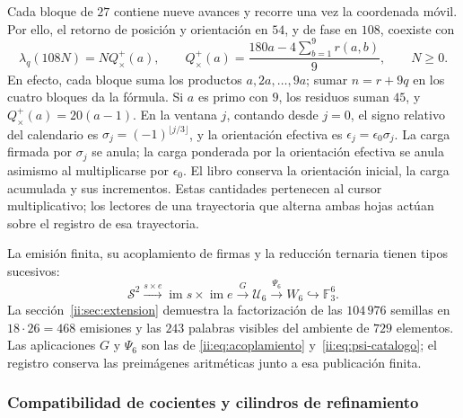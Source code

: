 Cada bloque de \(27\) contiene nueve avances y recorre una vez
la coordenada móvil. Por ello, el retorno de posición y orientación
en \(54\), y de fase en \(108\), coexiste con
\begin{equation}
 \lambda_q(108N)=NQ_\times^+(a),\qquad
 Q_\times^+(a)=\frac{180a-4\sum_{b=1}^9r(a,b)}9,
 \qquad N\geq0.
 \label{ii:prd-arit:retorno}
\end{equation}
En efecto, cada bloque suma los productos \(a,2a,\ldots,9a\);
sumar \(n=r+9q\) en los cuatro bloques da la fórmula. Si
\(a\) es primo con \(9\), los residuos suman \(45\), y
\(Q_\times^+(a)=20(a-1)\). En la ventana \(j\), contando desde
\(j=0\), el signo relativo del calendario es
\(\sigma_j=(-1)^{\lfloor j/3\rfloor}\), y la orientación
efectiva es \(\epsilon_j=\epsilon_0\sigma_j\).
La carga firmada por \(\sigma_j\) se anula; la carga ponderada
por la orientación efectiva se anula asimismo al multiplicarse por
\(\epsilon_0\). El libro conserva la orientación inicial, la carga
acumulada y sus incrementos. Estas cantidades pertenecen
al cursor multiplicativo; los lectores de una trayectoria que
alterna ambas hojas actúan sobre el registro de esa trayectoria.



La emisión finita, su acoplamiento de firmas y la reducción ternaria tienen
tipos sucesivos:
\[
 \mathcal S^2\xrightarrow{s\times e}
 \operatorname{im}s\times\operatorname{im}e
 \xrightarrow{G}\mathcal U_6
 \xrightarrow{\Psi_6}W_6\hookrightarrow\mathbb F_3^6.
\]
La sección~\ref{ii:sec:extension} demuestra la factorización de las
\(104\,976\) semillas en \(18\cdot26=468\) emisiones y las
\(243\) palabras visibles del ambiente de \(729\) elementos. Las
aplicaciones \(G\) y \(\Psi_6\) son las de
\eqref{ii:eq:acoplamiento} y~\eqref{ii:eq:psi-catalogo}; el registro conserva
las preimágenes aritméticas junto a esa publicación finita.

\subsubsection{Compatibilidad de cocientes y cilindros de refinamiento}

